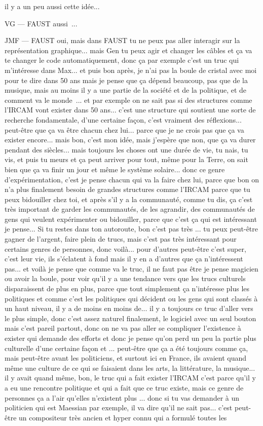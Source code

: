 il y a un peu aussi cette idée... 

VG — FAUST aussi ... 

JMF — FAUST oui, mais dans FAUST tu ne peux pas aller interagir sur la représentation graphique... mais Gen tu peux agir et changer les câbles et ça va te changer le code automatiquement, donc ça par exemple c'est un truc qui m'intéresse dans Max... et puis bon après, je n'ai pas la boule de cristal avec moi pour te dire dans 50 ans mais je pense que ça dépend beaucoup, pas que de la musique, mais au moins il y a une partie de la société et de la politique, et de comment va le monde ... et par exemple on ne sait pas si des structures comme l'IRCAM vont exister dans 50 ans... c'est une structure qui soutient une sorte de recherche fondamentale, d'une certaine façon, c'est vraiment des réflexions... peut-être que ça va être chacun chez lui... parce que je ne crois pas que ça va exister encore... mais bon, c'est mon idée, mais j'espère que non, que ça va durer pendant des siècles... mais toujours les choses ont une durée de vie, tu nais, tu vis, et puis tu meurs et ça peut arriver pour tout, même pour la Terre, on sait bien que ça va finir un jour et même le système solaire... donc ce genre d'expérimentation, c'est je pense chacun qui va la faire chez lui, parce que bon on n'a plus finalement besoin de grandes structures comme l'IRCAM parce que tu peux bidouiller chez toi, et après s'il y a la communauté, comme tu dis, ça c'est très important de garder les communautés, de les agrandir, des communautés de gens qui veulent expérimenter ou bidouiller, parce que c'est ça qui est intéressant je pense... Si tu restes dans ton autoroute, bon c'est pas très ... tu peux peut-être gagner de l'argent, faire plein de trucs, mais c'est pas très intéressant pour certains genres de personnes, donc voilà... pour d'autres peut-être c'est super, c'est leur vie, ils s'éclatent à fond mais il y en a d'autres que ça n'intéressent pas... et voilà je pense que comme va le truc, il ne faut pas être je pense magicien ou avoir la boule, pour voir qu'il y a une tendance vers que les trucs culturels disparaissent de plus en plus, parce que tout simplement ça n'intéresse plus les politiques et comme c'est les politiques qui décident ou les gens qui sont classés à un haut niveau, il y a de moins en moins de... il y a toujours ce truc d'aller vers le plus simple, donc c'est assez naturel finalement, le logiciel avec un seul bouton mais c'est pareil partout, donc on ne va pas aller se compliquer l'existence à exister qui demande des efforts et donc je pense qu'on perd un peu la partie plus culturelle d'une certaine façon et ... peut-être que ça a été toujours comme ça, mais peut-être avant les politiciens, et surtout ici en France, ils avaient quand même une culture de ce qui se faisaient dans les arts, la littérature, la musique... il y avait quand même, bon, le truc qui a fait exister l'IRCAM c'est parce qu'il y a eu une rencontre politique et qui a fait que ce truc existe, mais ce genre de personnes ça a l'air qu'elles n'existent plus ... donc si tu vas demander à un politicien qui est Maessian par exemple, il va dire qu'il ne sait pas... c'est peut-être un compositeur très ancien et hyper connu qui a formulé toutes les 